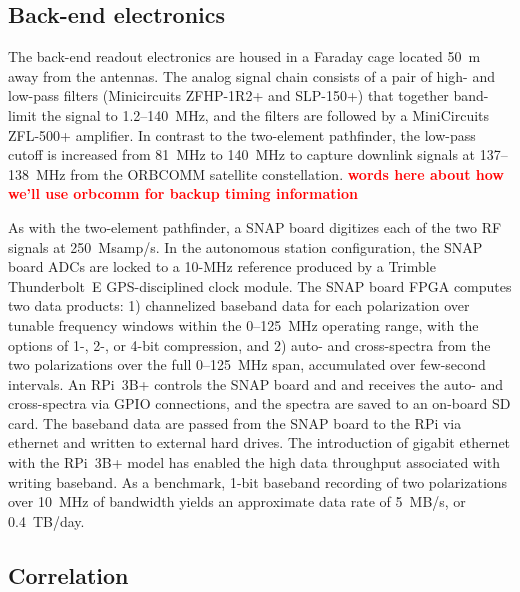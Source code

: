 \documentclass{ws-jai}
\newcommand{\attention}[1]{\textcolor{red}{\bf {#1}}}
\begin{document}

\subsection{Back-end electronics}

The back-end readout electronics are housed in a Faraday cage located
50~m away from the antennas. The analog signal chain consists of a
pair of high- and low-pass filters (Minicircuits ZFHP-1R2+ and
SLP-150+) that together band-limit the signal to 1.2--140~MHz, and the
filters are followed by a MiniCircuits ZFL-500+ amplifier.  In
contrast to the two-element pathfinder, the low-pass cutoff is
increased from 81~MHz to 140~MHz to capture downlink signals at
137--138~MHz from the ORBCOMM satellite constellation.
\attention{words here about how we'll use orbcomm for backup timing
  information}

As with the two-element pathfinder, a SNAP board digitizes each of the
two RF signals at 250~Msamp/s. In the autonomous station
configuration, the SNAP board ADCs are locked to a 10-MHz reference
produced by a Trimble Thunderbolt~E GPS-disciplined clock module.  The
SNAP board FPGA computes two data products: 1) channelized baseband
data for each polarization over tunable frequency windows within the
0--125~MHz operating range, with the options of 1-, 2-, or 4-bit
compression, and 2) auto- and cross-spectra from the two polarizations
over the full 0--125~MHz span, accumulated over few-second intervals.
An RPi~3B+ controls the SNAP board and and receives the auto- and
cross-spectra via GPIO connections, and the spectra are saved to an
on-board SD card.  The baseband data are passed from the SNAP board to
the RPi via ethernet and written to external hard drives.  The
introduction of gigabit ethernet with the RPi~3B+ model has enabled
the high data throughput associated with writing baseband.  As a
benchmark, 1-bit baseband recording of two polarizations over 10~MHz
of bandwidth yields an approximate data rate of 5~MB/s, or 0.4~TB/day.

\subsection{Correlation}
\end{document}
